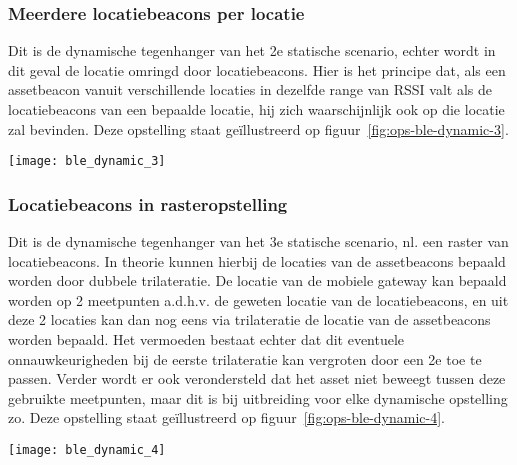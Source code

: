 \subsubsection{Meerdere locatiebeacons per locatie}
\begin{minipage}{0.65\textwidth}
Dit is de dynamische tegenhanger van het 2e statische scenario, echter wordt in dit geval de locatie omringd door locatiebeacons. Hier is het principe dat, als een assetbeacon vanuit verschillende locaties in dezelfde range van RSSI valt als de locatiebeacons van een bepaalde locatie, hij zich waarschijnlijk ook op die locatie zal bevinden. Deze opstelling staat geïllustreerd op figuur~\ref{fig:ops-ble-dynamic-3}.
\end{minipage}
\hfill
\begin{minipage}{0.30\textwidth}
	\texttt{[image: ble\_dynamic\_3]}
	\label{fig:ops-ble-dynamic-3}
\end{minipage}

\subsubsection{Locatiebeacons in rasteropstelling}
\begin{minipage}{0.65\textwidth}
Dit is de dynamische tegenhanger van het 3e statische scenario, nl. een raster van locatiebeacons. In theorie kunnen hierbij de locaties van de assetbeacons bepaald worden door dubbele trilateratie. De locatie van de mobiele gateway kan bepaald worden op 2 meetpunten a.d.h.v. de geweten locatie van de locatiebeacons, en uit deze 2 locaties kan dan nog eens via trilateratie de locatie van de assetbeacons worden bepaald. Het vermoeden bestaat echter dat dit eventuele onnauwkeurigheden bij de eerste trilateratie kan vergroten door een 2e toe te passen. Verder wordt er ook verondersteld dat het asset niet beweegt tussen deze gebruikte meetpunten, maar dit is bij uitbreiding voor elke dynamische opstelling zo. Deze opstelling staat geïllustreerd op figuur~\ref{fig:ops-ble-dynamic-4}.
\end{minipage}
\hfill
\begin{minipage}{0.30\textwidth}
	\texttt{[image: ble\_dynamic\_4]}
	\label{fig:ops-ble-dynamic-4}
\end{minipage}


